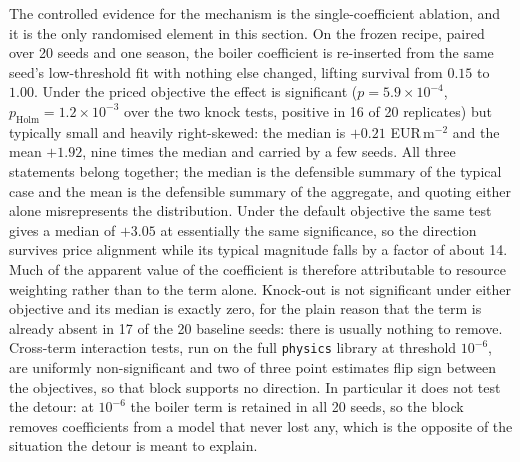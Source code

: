 The controlled evidence for the mechanism is the single-coefficient ablation, and it is
the only randomised element in this section. On the frozen recipe, paired over 20 seeds
and one season, the boiler coefficient is re-inserted from the same seed's low-threshold
fit with nothing else changed, lifting survival from $0.15$ to $1.00$. Under the priced
objective the effect is significant ($p = 5.9\times10^{-4}$, $p_{\text{Holm}}=
1.2\times10^{-3}$ over the two knock tests, positive in 16 of 20 replicates) but typically
small and heavily right-skewed: the median is $+0.21$ EUR\,m$^{-2}$ and the mean $+1.92$,
nine times the median and carried by a few seeds. All three statements belong together;
the median is the defensible summary of the typical case and the mean is the defensible
summary of the aggregate, and quoting either alone misrepresents the distribution. Under
the default objective the same test gives a median of $+3.05$ at essentially the same
significance, so the direction survives price alignment while its typical magnitude falls
by a factor of about 14. Much of the apparent value of the coefficient is therefore
attributable to resource weighting rather than to the term alone. Knock-out is not significant under either
objective and its median is exactly zero, for the plain reason that the term is already
absent in 17 of the 20 baseline seeds: there is usually nothing to remove. Cross-term
interaction tests, run on the full \texttt{physics} library at threshold $10^{-6}$, are
uniformly non-significant and two of three point estimates flip sign between the
objectives, so that block supports no direction. In particular it does not test the
detour: at $10^{-6}$ the boiler term is retained in all 20 seeds, so the block removes
coefficients from a model that never lost any, which is the opposite of the situation the
detour is meant to explain.

